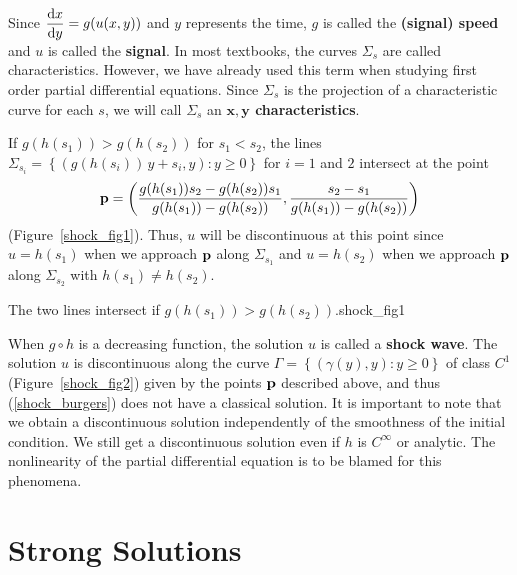 Since $\displaystyle \frac{\mathrm{d}x}{\mathrm{d}{y}} = g(u(x,y))$ and $y$ represents the time,
$g$ is called the
{\bfseries (signal) speed} and
$u$ is called the {\bfseries signal}.
In most textbooks, the curves $\Sigma_s$ are called characteristics.  However,
we have already used this term when studying first order partial
differential equations.  Since $\Sigma_s$ is the projection of a
characteristic curve for each $s$, we will call $\Sigma_s$ an
{\bfseries $\mathbf{x,y}$ characteristics}.

If $g(h(s_1)) > g(h(s_2))$ for $s_1 < s_2$, the lines
$\displaystyle \Sigma_{s_i} = \left\{ (g(h(s_i))\,y + s_i,y) : y \geq 0
\right\}$ for $i=1$ and $2$ intersect at the point
\[
\mathbf{p} = \left( \frac{g(h(s_1)) s_2 - g(h(s_2))s_1}{g(h(s_1))-g(h(s_2))},
\frac{s_2-s_1}{g(h(s_1))-g(h(s_2))}\right)
\]
(Figure~\ref{shock_fig1}).
Thus, $u$ will be discontinuous at this point since
$u=h(s_1)$ when we approach $\mathbf{p}$ along $\Sigma_{s_1}$ and
$u=h(s_2)$ when we approach $\mathbf{p}$ along $\Sigma_{s_2}$ with 
$h(s_1) \neq h(s_2)$.

{The two lines intersect if $g(h(s_1))>g(h(s_2))$.}{shock_fig1}

When $g\circ h$ is a decreasing function, the solution $u$ is called a
{\bfseries shock wave}\label{Shock Wave}.  The solution $u$ is
discontinuous along the curve
$\displaystyle \Gamma = \left\{ (\gamma(y),y) : y \geq 0 \right\}$ of
class $\displaystyle C^1$
(Figure~\ref{shock_fig2}) given by the points $\mathbf{p}$ described
above, and thus (\ref{shock_burgers}) does not
have a classical solution.  It is important to note that we obtain a
discontinuous solution independently of the smoothness of the initial
condition.  We still get a discontinuous solution even if $h$ is
$\displaystyle C^\infty$ or analytic.  The nonlinearity of the partial
differential equation is to be blamed for this phenomena.


\section{Strong Solutions}

